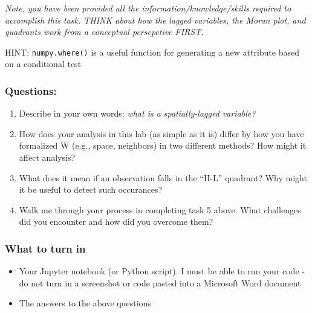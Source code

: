 \documentclass[]{article}
\begin{document}
\emph{Note, you have been provided all the information/knowledge/skills
required to accomplish this task. THINK about how the lagged variables,
the Moran plot, and quadrants work from a conceptual persepctive FIRST.}

HINT: \texttt{numpy.where()} is a useful function for generating a new
attribute based on a conditional test

\hypertarget{questions}{%
\subsubsection{Questions:}\label{questions}}

\begin{enumerate}
\def\labelenumi{\arabic{enumi}.}
\item
  Describe in your own words: \emph{what is a spatially-lagged
  variable?}
\item
  How does your analysis in this lab (as simple as it is) differ by how
  you have formalized W (e.g., space, neighbors) in two different
  methods? How might it affect analysis?
\item
  What does it mean if an observation falls in the ``H-L'' quadrant? Why
  might it be useful to detect such occurances?
\item
  Walk me through your process in completing task 5 above. What
  challenges did you encounter and how did you overcome them?
\end{enumerate}

\hypertarget{what-to-turn-in}{%
\subsubsection{What to turn in}\label{what-to-turn-in}}

\begin{itemize}
\item
  Your Jupyter notebook (or Python script). I must be able to run your
  code - do not turn in a screenshot or code pasted into a Microsoft
  Word document
\item
  The answers to the above questions
\end{itemize}
\end{document}
